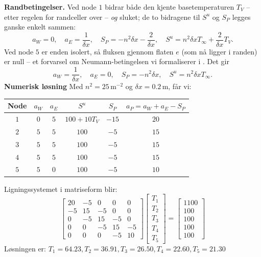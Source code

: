 \textbf{Randbetingelser.} Ved node $1$ bidrar både den kjente basetemperaturen $T_V$ -- etter regelen for randceller over -- \emph{og} sluket; de to bidragene til $S^u$ og $S_P$ legges ganske enkelt sammen:
\[
a_W = 0, \quad a_E = \frac{1}{\delta x},\quad S_P = -n^2 \delta x - \frac{2}{\delta x}, \quad S^u = n^2 \delta x T_\infty + \frac{2}{\delta x} T_V.
\]
Ved node $5$ er enden isolert, så fluksen gjennom flaten $e$ (som nå ligger i randen) er null -- et forvarsel om Neumann-betingelsen vi formaliserer i . Det gir
\[
a_W=\frac{1}{\delta x}, \quad a_E = 0,\quad S_P = -n^2 \delta x, \quad S^u = n^2 \delta x T_\infty.
\]
\textbf{Numerisk løsning}
Med $n^2 = 25\,\text{m}^{-2}$ og $\delta x = 0.2\,\text{m}$, får vi:
\begin{center}
\begin{tabular}{|c|c|c|c|c|c|}
\hline
Node & $a_W$ & $a_E$ & $S^u$ & $S_P$ & $a_P=a_W+a_E-S_P$ \\
\hline
$1$ & $0$ & $5$ & $100+10T_V$ & $-15$ & $20$ \\
$2$ & $5$ & $5$ &   $100$ &  $-5$ & $15$ \\
$3$ & $5$ & $5$ &   $100$ &  $-5$ & $15$ \\
$4$ & $5$ & $5$ &   $100$ &  $-5$ & $15$ \\
$5$ & $5$ & $0$ &  $100$ & $-5$ & $10$ \\
\hline
\end{tabular}
\end{center}
Ligningssystemet i matriseform blir:
\[
\begin{bmatrix}
20 & -5 & 0 & 0&0 \\
-5 & 15 & -5 & 0 & 0 \\
0& -5& 15 & -5 & 0\\
0&0&-5& 15 &-5 \\
0&0&0&-5&10
\end{bmatrix}
\begin{bmatrix} T_1 \\ T_2 \\ T_3 \\ T_4 \\ T_5 \end{bmatrix} = \begin{bmatrix} 
1100\\ 100 \\ 100 \\ 100 \\ 100\end{bmatrix}
\]
Løsningen er:
$
T_1 = 64.23, T_2 = 36.91, T_3 = 26.50, T_4 = 22.60, T_5 = 21.30
$

